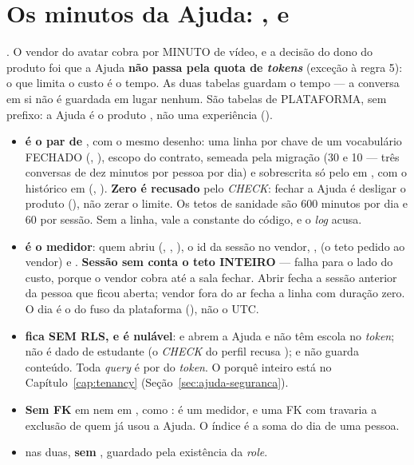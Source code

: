 \section{Os minutos da Ajuda: ,  e }
\label{sec:ajuda-dados}

. O vendor do avatar cobra por MINUTO de vídeo, e a decisão do dono
do produto foi que a Ajuda \textbf{não passa pela quota de \emph{tokens}}
(exceção à regra 5): o que limita o custo é o tempo. As duas tabelas guardam o
tempo --- a conversa em si não é guardada em lugar nenhum. São tabelas de
PLATAFORMA, sem prefixo: a Ajuda é o produto , não uma experiência
().

\begin{itemize}
  \item \textbf{ é o par de }, com o mesmo
    desenho: uma linha por chave de um vocabulário FECHADO
    (, ), escopo do contrato, semeada
    pela migração (30 e 10 --- três conversas de dez minutos por pessoa por dia)
    e sobrescrita só pelo  em , com o
    histórico em  (, 
    ). \textbf{Zero é recusado} pelo \emph{CHECK}: fechar a
    Ajuda é desligar o produto (), não zerar o limite. Os tetos de
    sanidade são 600 minutos por dia e 60 por sessão. Sem a linha, vale a
    constante do código, e o \emph{log}  acusa.
  \item \textbf{ é o medidor}: quem abriu (,
    , ), o id da sessão no vendor, ,
     (o teto pedido ao vendor) e . \textbf{Sessão sem
     conta o teto INTEIRO} --- falha para o lado do custo, porque o
    vendor cobra até a sala fechar. Abrir fecha a sessão anterior da pessoa que
    ficou aberta; vendor fora do ar fecha a linha com duração zero. O dia é o do
    fuso da plataforma (), não o UTC.
  \item \textbf{ fica SEM RLS, e  é nulável}:
     e  abrem a Ajuda e não têm escola no
    \emph{token}; não é dado de estudante (o \emph{CHECK} do perfil recusa
    ); e não guarda conteúdo. Toda \emph{query} é por
     do \emph{token}. O porquê inteiro está no
    Capítulo~\ref{cap:tenancy} (Seção~\ref{sec:ajuda-seguranca}).
  \item \textbf{Sem FK} em  nem em , como
    : é um medidor, e uma FK com  travaria a
    exclusão de quem já usou a Ajuda. O índice
     é a soma do dia de uma pessoa.
  \item {}  nas duas, \textbf{sem
    }, guardado pela existência da \emph{role}.
\end{itemize}

